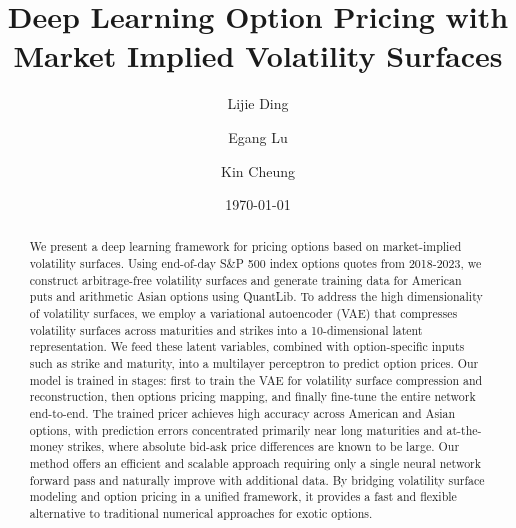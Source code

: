 \documentclass[%
 reprint,
 superscriptaddress,
nobibnotes,
 amsmath,amssymb,
 aip,
]{revtex4-2}
\begin{document}

\title{Deep Learning Option Pricing with Market Implied Volatility Surfaces}

\author{Lijie Ding}
\author{Egang Lu}
{}
\author{Kin Cheung}
\date{\today}%

\begin{abstract}
We present a deep learning framework for pricing options based on market-implied volatility surfaces. Using end-of-day S\&P 500 index options quotes from 2018-2023, we construct arbitrage-free volatility surfaces and generate training data for American puts and arithmetic Asian options using QuantLib. To address the high dimensionality of volatility surfaces, we employ a variational autoencoder (VAE) that compresses volatility surfaces across maturities and strikes into a 10-dimensional latent representation. We feed these latent variables, combined with option-specific inputs such as strike and maturity, into a multilayer perceptron to predict option prices. Our model is trained in stages: first to train the VAE for volatility surface compression and reconstruction, then options pricing mapping, and finally fine-tune the entire network end-to-end. The trained pricer achieves high accuracy across American and Asian options, with prediction errors concentrated primarily near long maturities and at-the-money strikes, where absolute bid-ask price differences are known to be large. Our method offers an efficient and scalable approach requiring only a single neural network forward pass and naturally improve with additional data. By bridging volatility surface modeling and option pricing in a unified framework, it provides a fast and flexible alternative to traditional numerical approaches for exotic options.
\end{abstract}
\maketitle

\end{document}
